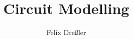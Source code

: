 \documentclass[utf8,aspectratio=169,ngerman,english]{beamer}
\begin{document}


\title{Circuit Modelling}


\author{Felix Dreßler}



\date[\today]{} %





\end{document}
